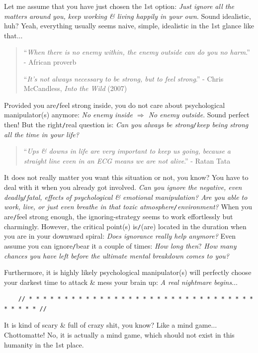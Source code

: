 \documentclass[12pt]{article}
\begin{document}
Let me assume that you have just chosen the 1st option: {\it Just ignore all the matters around you, keep working \& living happily in your own}. Sound idealistic, huh? Yeah, everything usually seems naive, simple, idealistic in the 1st glance like that$\ldots$
\begin{quotation}
	``{\it When there is no enemy within, the enemy outside can do you no harm}.'' - African proverb
	
	``{\it It's not always necessary to be strong, but to feel strong}.'' - Chris McCandless, {\it Into the Wild} (2007)
\end{quotation}
Provided you are{\tt/}feel strong inside, you do not care about psychological manipulator(s) anymore: {\it No enemy inside $\Rightarrow$ No enemy outside}. Sound perfect then! But the right{\tt/}real question is: {\it Can you always be strong{\tt/}keep being strong all the time in your life?}
\begin{quotation}
	``{\it Ups \& downs in life are very important to keep us going, because a straight line even in an ECG means we are not alive}.'' - Ratan Tata
\end{quotation}
It does not really matter you want this situation or not, you know? You have to deal with it when you already got involved. {\it Can you ignore the negative, even deadly{\tt/}fatal, effects of psychological \& emotional manipulation? Are you able to work, live, or just even breathe in that toxic atmosphere{\tt/}environment?} When you are{\tt/}feel strong enough, the ignoring-strategy seems to work effortlessly but charmingly. However, the critical point(s) is{\tt/}(are) located in the duration when you are in your downward spiral: {\it Does ignorance really help anymore?} Even assume you can ignore{\tt/}bear it a couple of times: {\it How long then}? {\it How many chances you have left before the ultimate mental breakdown comes to you?}

Furthermore, it is highly likely psychological manipulator(s) will perfectly choose your darkest time to attack \& mess your brain up: {\it A real nightmare begins}$\ldots$

\begin{verbatim}
	// * * * * * * * * * * * * * * * * * * * * * * * * * * * * * * * * * * * * * //
\end{verbatim}

\noindent
{} It is kind of scary \& full of crazy shit, you know? Like a mind game$\ldots$ Chottomatte! No, it is actually a mind game, which should not exist in this humanity in the 1st place.
\end{document}

